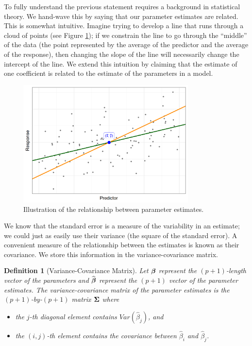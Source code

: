 \documentclass[
]{book}
\providecommand{\tightlist}{%
  \setlength{\itemsep}{0pt}\setlength{\parskip}{0pt}}
\theoremstyle{plain}
\theoremstyle{mydefn}
\newtheorem{definition}{Definition}[chapter]
\theoremstyle{myexmpl}
\theoremstyle{remark}
\begin{document}
To fully understand the previous statement requires a background in statistical theory. We hand-wave this by saying that our parameter estimates are related. This is somewhat intuitive. Imagine trying to develop a line that runs through a cloud of points (see Figure \ref{fig:glm-linear-hypotheses-line}); if we constrain the line to go through the ``middle'' of the data (the point represented by the average of the predictor and the average of the response), then changing the slope of the line will necessarily change the intercept of the line. We extend this intuition by claiming that the estimate of one coefficient is related to the estimate of the parameters in a model.

\begin{figure}

{\centering \includegraphics[width=0.8\textwidth]{./Images/glm-linear-hypotheses-line-1} 

}

\caption{Illustration of the relationship between parameter estimates.}\label{fig:glm-linear-hypotheses-line}
\end{figure}

We know that the standard error is a measure of the variability in an estimate; we could just as easily use their variance (the square of the standard error). A convenient measure of the relationship between the estimates is known as their covariance. We store this information in the variance-covariance matrix.

\begin{definition}[Variance-Covariance Matrix]
\protect\hypertarget{def:defn-variance-covariance-matrix}{}{\label{def:defn-variance-covariance-matrix} {} }Let \(\boldsymbol{\beta}\) represent the \((p+1)\)-length vector of the parameters and \(\widehat{\boldsymbol{\beta}}\) represent the \((p+1)\) vector of the parameter \emph{estimates}. The variance-covariance matrix of the parameter estimates is the \((p+1)\)-by-\((p+1)\) matrix \(\boldsymbol{\Sigma}\) where

\begin{itemize}
\tightlist
\item
  the \(j\)-th diagonal element contains \(Var\left(\widehat{\beta}_j\right)\), and
\item
  the \((i,j)\)-th element contains the covariance between \(\widehat{\beta}_i\) and \(\widehat{\beta}_j\).
\end{itemize}
\end{definition}
\end{document}
